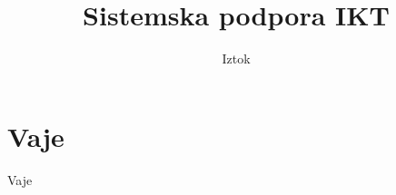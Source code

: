 \documentclass[12pt]{beamer}
\title{Sistemska podpora IKT}
\author{Iztok}
\begin{document}
\begin{frame}
  \titlepage
\end{frame}



\section{Vaje}

\begin{frame}{Vaje}

\end{frame}
\end{document}

